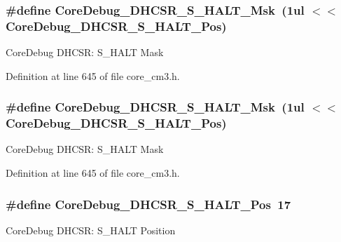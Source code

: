 \subsubsection[{\texorpdfstring{Core\+Debug\+\_\+\+D\+H\+C\+S\+R\+\_\+\+S\+\_\+\+H\+A\+L\+T\+\_\+\+Msk}{CoreDebug_DHCSR_S_HALT_Msk}}]{\setlength{\rightskip}{0pt plus 5cm}\#define Core\+Debug\+\_\+\+D\+H\+C\+S\+R\+\_\+\+S\+\_\+\+H\+A\+L\+T\+\_\+\+Msk~(1ul $<$$<$ Core\+Debug\+\_\+\+D\+H\+C\+S\+R\+\_\+\+S\+\_\+\+H\+A\+L\+T\+\_\+\+Pos)}\hypertarget{group___c_m_s_i_s___c_m3___core_debug_ga9f881ade3151a73bc5b02b73fe6473ca}{}\label{group___c_m_s_i_s___c_m3___core_debug_ga9f881ade3151a73bc5b02b73fe6473ca}
Core\+Debug D\+H\+C\+SR\+: S\+\_\+\+H\+A\+LT Mask 

Definition at line 645 of file core\+\_\+cm3.\+h.

\subsubsection[{\texorpdfstring{Core\+Debug\+\_\+\+D\+H\+C\+S\+R\+\_\+\+S\+\_\+\+H\+A\+L\+T\+\_\+\+Msk}{CoreDebug_DHCSR_S_HALT_Msk}}]{\setlength{\rightskip}{0pt plus 5cm}\#define Core\+Debug\+\_\+\+D\+H\+C\+S\+R\+\_\+\+S\+\_\+\+H\+A\+L\+T\+\_\+\+Msk~(1ul $<$$<$ Core\+Debug\+\_\+\+D\+H\+C\+S\+R\+\_\+\+S\+\_\+\+H\+A\+L\+T\+\_\+\+Pos)}\hypertarget{group___c_m_s_i_s___c_m3___core_debug_ga9f881ade3151a73bc5b02b73fe6473ca}{}\label{group___c_m_s_i_s___c_m3___core_debug_ga9f881ade3151a73bc5b02b73fe6473ca}
Core\+Debug D\+H\+C\+SR\+: S\+\_\+\+H\+A\+LT Mask 

Definition at line 645 of file core\+\_\+cm3.\+h.

\subsubsection[{\texorpdfstring{Core\+Debug\+\_\+\+D\+H\+C\+S\+R\+\_\+\+S\+\_\+\+H\+A\+L\+T\+\_\+\+Pos}{CoreDebug_DHCSR_S_HALT_Pos}}]{\setlength{\rightskip}{0pt plus 5cm}\#define Core\+Debug\+\_\+\+D\+H\+C\+S\+R\+\_\+\+S\+\_\+\+H\+A\+L\+T\+\_\+\+Pos~17}\hypertarget{group___c_m_s_i_s___c_m3___core_debug_ga760a9a0d7f39951dc3f07d01f1f64772}{}\label{group___c_m_s_i_s___c_m3___core_debug_ga760a9a0d7f39951dc3f07d01f1f64772}
Core\+Debug D\+H\+C\+SR\+: S\+\_\+\+H\+A\+LT Position 

